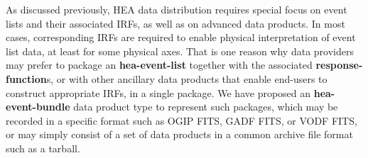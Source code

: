 
\newcommand{\blinks}{\{links\}}


As discussed previously, \gls{HEA} data distribution requires special focus on event lists and their associated \glspl{IRF}, as well as on advanced data products.  In most cases, corresponding \glspl{IRF} are required to enable physical interpretation of event list data, at least for some physical axes.  That is one reason why data providers may prefer to package an {\bf hea-event-list} together with the associated {\bf response-function}s, or with other ancillary data products that enable end-users to construct appropriate \glspl{IRF}, in a single package.  We have proposed an {\bf hea-event-bundle} data product type to represent such packages, which may be recorded in a specific format such as OGIP FITS, GADF FITS, or VODF FITS, or may simply consist of a set of data products in a common archive file format such as a tarball.

